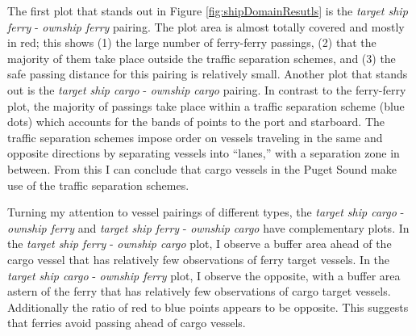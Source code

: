 \documentclass[twoside,symmetric,notoc]{tufte-book}
\begin{document}
\par{%
The first plot that stands out in Figure \ref{fig:shipDomainResutls} is the \textit{target ship ferry} - \textit{ownship ferry} pairing. The plot area is almost totally covered and mostly in red; this shows (1) the large number of ferry-ferry passings, (2) that the majority of them take place outside the traffic separation schemes, and (3) the safe passing distance for this pairing is relatively small. Another plot that stands out is the \textit{target ship cargo} - \textit{ownship cargo} pairing. In contrast to the ferry-ferry plot, the majority of passings take place within a traffic separation scheme (blue dots) which accounts for the bands of points to the port and starboard. The traffic separation schemes impose order on vessels traveling in the same and opposite directions by separating vessels into ``lanes,'' with a separation zone in between. From this I can conclude that cargo vessels in the Puget Sound make use of the traffic separation schemes. 
}
\par{%
Turning my attention to vessel pairings of different types, the \textit{target ship cargo} - \textit{ownship ferry} and \textit{target ship ferry} - \textit{ownship cargo} have complementary plots. In the \textit{target ship ferry} - \textit{ownship cargo} plot, I observe a buffer area ahead of the cargo vessel that has relatively few observations of ferry target vessels. In the \textit{target ship cargo} - \textit{ownship ferry} plot, I observe the opposite, with a buffer area astern of the ferry that has relatively few observations of cargo target vessels. Additionally the ratio of red to blue points appears to be opposite. This suggests that ferries avoid passing ahead of cargo vessels.
}
\end{document}
